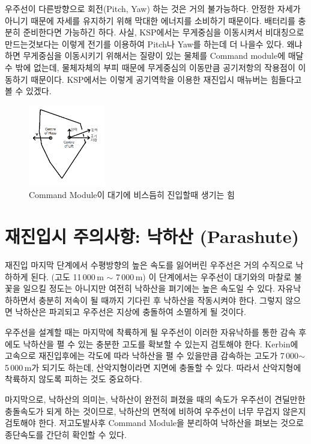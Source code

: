 \documentclass[9pt]{amsbook}
\begin{document}
우주선이 다른방향으로 회전(Pitch, Yaw) 하는 것은 거의 불가능하다. 안정한 자세가 아니기 때문에 자세를 유지하기 위해 막대한 에너지를 소비하기 때문이다. 배터리를 충분히 준비한다면 가능하긴 하다. 사실, KSP에서는 무게중심을 이동시켜서 비대칭으로 만드는것보다는 이렇게 전기를 이용하여 Pitch나 Yaw를 하는데 더 나을수 있다. 왜냐하면 무게중심을 이동시키기 위해서는 질량이 있는 물체를 Command module에 매달수 밖에 없는데, 물체자체의 부피 때문에 무게중심의 이동만큼 공기저항의 작용점이 이동하기 때문이다. KSP에서는 이렇게 공기역학을 이용한 재진입시 매뉴버는 힘들다고 볼 수 있겠다.

\begin{figure}
\caption{Command Module이 대기에 비스듬히 진입할때 생기는 힘}
\includegraphics[width=0.3\textwidth]{lift.png}
\end{figure}

\section{재진입시 주의사항: 낙하산 (Parashute)}
재진입 마지막 단계에서 수평방향의 높은 속도를 잃어버린 우주선은 거의 수직으로 낙하하게 된다. (고도 11\,000\,m $\sim$ 7\,000\,m) 이 단계에서는 우주선이 대기와의 마찰로 불꽃을 일으킬 정도는 아니지만 여전히 낙하산을 펴기에는 높은 속도일 수 있다. 자유낙하하면서 충분히 저속이 될 때까지 기다린 후 낙하산을 작동시켜야 한다. 그렇지 않으면 낙하산은 파괴되고 우주선은 지상에 충돌하여 소멸하게 될 것이다.

우주선을 설계할 때는 마지막에 착륙하게 될 우주선이 이러한 자유낙하를 통한 감속 후에도 낙하산을 펼 수 있는 충분한 고도를 확보할 수 있는지 검토해야 한다. Kerbin에 고속으로 재진입후에는 각도에 따라 낙하산을 펼 수 있을만큼 감속하는 고도가 7\,000$\sim$5\,000\,m가 되기도 하는데, 산악지형이라면 지면에 충돌할 수 있다. 따라서 산악지형에 착륙하지 않도록 피하는 것도 중요하다.

마지막으로, 낙하산의 의미는, 낙하산이 완전히 펴졌을 때의 속도가 우주선이 견딜만한 충돌속도가 되게 하는 것이므로, 낙하산의 면적에 비하여 우주선이 너무 무겁지 않은지 검토해야 한다. 저고도발사후 Command Module을 분리하여 낙하산을 펴보는 것으로 종단속도를 간단히 확인할 수 있다.
\end{document}
